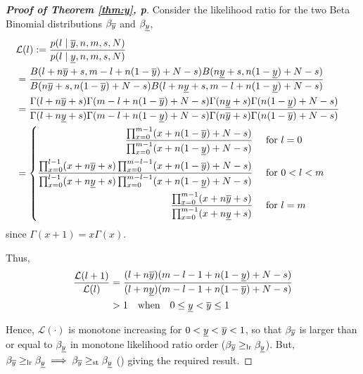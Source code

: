 \documentclass[12pt, a4paper]{elsarticle}
\begin{document}
\begin{proof}[\textbf{Proof of Theorem \ref{thm:y}, p\pageref{thm:y}}]
  \label{prf:y}
  Consider the likelihood ratio for the two Beta Binomial distributions $\beta_{\overline{y}}$ and $\beta_{\underline{y}}$,
  \begin{align*}
    \lefteqn{\mathcal{L}(l) := \frac{p(l \mid \yu, n, m, s, N)}{p(l \mid \yl, n, m, s, N)}} \\
    &= \frac{B(l + n \yu + s, m - l + n (1 - \yu) + N - s) B(n \yl + s, n (1 - \yl) + N - s)}
            {B(n \yu + s, n (1 - \yu) + N - s) B(l + n \yl + s, m - l + n (1 - \yl) + N - s)} \\
    &= \frac{\Gamma(l + n \yu + s) \Gamma(m - l + n (1 - \yu) + N - s) \Gamma(n \yl + s) \Gamma(n (1 - \yl) + N - s)}
            {\Gamma(l + n \yl + s) \Gamma(m - l + n (1 - \yl) + N - s) \Gamma(n \yu + s) \Gamma(n (1 - \yu) + N - s)} \\
    &= \left\{ \begin{aligned}
         \frac{\prod_{x=0}^{m-1} (x + n (1 - \yu) + N - s)}
              {\prod_{x=0}^{m-1} (x + n (1 - \yl) + N - s)} &\quad\mbox{ for } l=0 \\
         \frac{\prod_{x=0}^{l-1} (x + n \yu + s) \prod_{x=0}^{m-l-1} (x + n (1 - \yu) + N - s)}
              {\prod_{x=0}^{l-1} (x + n \yl + s) \prod_{x=0}^{m-l-1} (x + n (1 - \yl) + N - s)} &\quad\mbox{ for } 0<l<m \\
         \frac{\prod_{x=0}^{m-1} (x + n \yu + s)}
              {\prod_{x=0}^{m-1} (x + n \yl + s)} &\quad\mbox{ for } l=m
       \end{aligned} \right.
  \end{align*}
  since $\Gamma(x+1)=x \Gamma(x)$.
  
  Thus,
  \begin{align*}
    \frac{\mathcal{L}(l+1)}{\mathcal{L}(l)} &=
      \frac{(l + n \overline{y}) (m - l - 1 + n (1 - \underline{y}) + N - s)}
           {(l + n \underline{y}) (m - l - 1 + n (1 - \overline{y}) + N - s)} \\
    &> 1 \quad\mbox{when}\quad 0 \le \underline{y} < \overline{y} \le 1
  \end{align*}
    
  Hence, $\mathcal{L}(\cdot)$ is monotone increasing for $0 < \underline{y} < \overline{y} < 1$, so that $\beta_{\overline{y}}$ is larger than or equal to $\beta_{\underline{y}}$ in monotone likelihood ratio order ($\beta_{\overline{y}} \ge_\mathrm{lr} \beta_{\underline{y}}$).  But, $\beta_{\overline{y}} \ge_\mathrm{lr} \beta_{\underline{y}} \implies \beta_{\overline{y}} \ge_\mathrm{st} \beta_{\underline{y}}$ (\cite[Theorem 1.C.1, p.43]{shaked2007}) giving the required result.
\end{proof}
\end{document}
